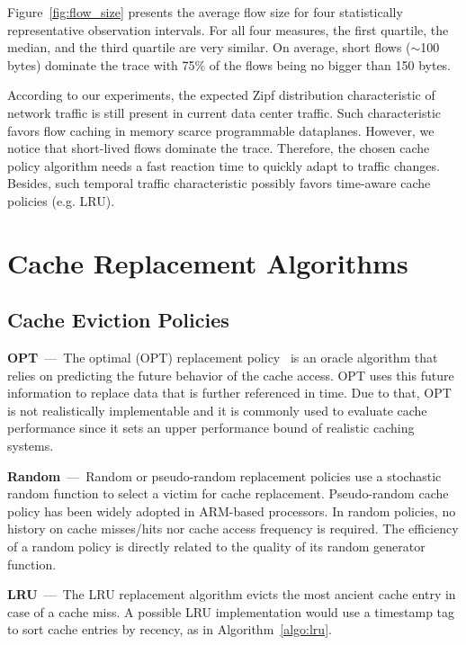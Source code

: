 Figure~\ref{fig:flow_size} presents the average flow size for four statistically representative observation intervals.
For all four measures, the first quartile, the median, and the third quartile are very similar.
On average, short flows ($\sim$100 bytes) dominate the trace with 75\% of the flows being no bigger than 150 bytes.

According to our experiments, the expected Zipf distribution characteristic of network traffic is still present in current data center traffic.
Such characteristic favors flow caching in memory scarce programmable dataplanes.
However, we notice that short-lived flows dominate the trace.
Therefore, the chosen cache policy algorithm needs a fast reaction time to quickly adapt to traffic changes.
Besides, such temporal traffic characteristic possibly favors time-aware cache policies (e.g. LRU).

\section{Cache Replacement Algorithms}\label{sec:policies}

\subsection{Cache Eviction Policies}

\textbf{OPT}~---~The optimal (OPT) replacement policy~\cite{Belady:66} is an oracle algorithm that relies on predicting the future behavior of the cache access.
OPT uses this future information to replace data that is further referenced in time.
Due to that, OPT is not realistically implementable and it is commonly used to evaluate cache performance since it sets an upper performance bound of realistic caching systems.

\textbf{Random}~---~Random or pseudo-random replacement policies use a stochastic random function to select a victim for cache replacement.
Pseudo-random cache policy has been widely adopted in ARM-based processors.
In random policies, no history on cache misses/hits nor cache access frequency is required.
The efficiency of a random policy is directly related to the quality of its random generator function.

\textbf{LRU}~---~The LRU replacement algorithm evicts the most ancient cache entry in case of a cache miss.
A possible LRU implementation would use a timestamp tag to sort cache entries by recency, as in Algorithm~\ref{algo:lru}.

